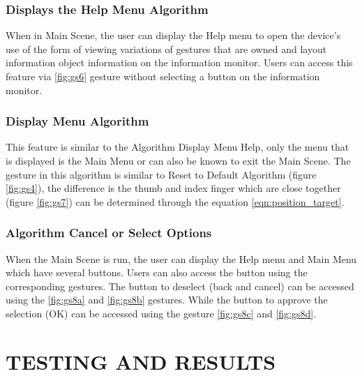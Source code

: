 \documentclass[conference]{IEEEtran}
\begin{document}
	\subsubsection{Displays the Help Menu Algorithm}
		When in Main Scene, the user can display the Help menu to open the device's use of the form of viewing variations of gestures that are owned and layout information object information on the information monitor. Users can access this feature via \ref{fig:gs6} gesture without selecting a button on the information monitor.

	\subsubsection{Display Menu Algorithm}
		This feature is similar to the Algorithm Display Menu Help, only the menu that is displayed is the Main Menu or can also be known to exit the Main Scene. The gesture in this algorithm is similar to Reset to Default Algorithm (figure \ref{fig:gs4}), the difference is the thumb and index finger which are close together (figure \ref{fig:gs7}) can be determined through the equation \ref{eqn:position_target}.

	\subsubsection{Algorithm Cancel or Select Options }
		When the Main Scene is run, the user can display the Help menu and Main Menu which have several buttons. Users can also access the button using the corresponding gestures. The button to deselect (back and cancel) can be accessed using the \ref{fig:gs8a} and \ref{fig:gs8b} gestures. While the button to approve the selection (OK) can be accessed using the gesture \ref{fig:gs8c} and \ref{fig:gs8d}.


\section{TESTING AND RESULTS}
\end{document}
